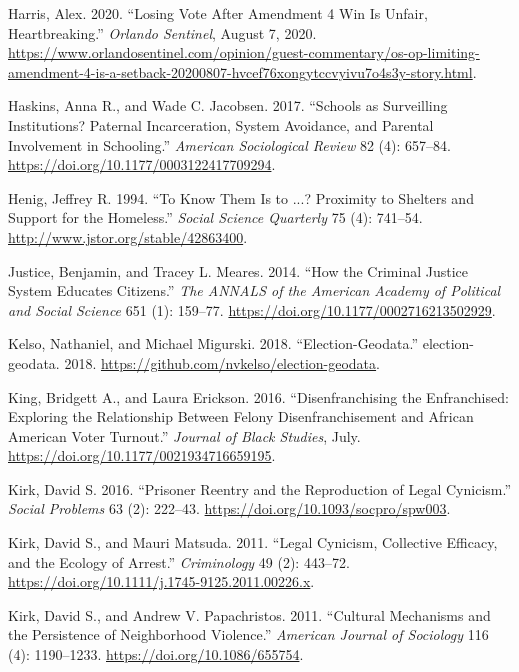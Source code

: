 \documentclass[
  12pt,
]{article}
\newlength{\cslhangindent}
\newenvironment{cslreferences}%
  {\setlength{\parindent}{0pt}%
  \everypar{\setlength{\hangindent}{\cslhangindent}}\ignorespaces}%
  {\par}
\begin{document}
\begin{cslreferences}
\leavevmode\hypertarget{ref-Harris2020}{}%
Harris, Alex. 2020. ``Losing Vote After Amendment 4 Win Is Unfair, Heartbreaking.'' \emph{Orlando Sentinel}, August 7, 2020. \url{https://www.orlandosentinel.com/opinion/guest-commentary/os-op-limiting-amendment-4-is-a-setback-20200807-hvcef76xongytccvyivu7o4s3y-story.html}.

\leavevmode\hypertarget{ref-Haskins2017}{}%
Haskins, Anna R., and Wade C. Jacobsen. 2017. ``Schools as Surveilling Institutions? Paternal Incarceration, System Avoidance, and Parental Involvement in Schooling.'' \emph{American Sociological Review} 82 (4): 657--84. \url{https://doi.org/10.1177/0003122417709294}.

\leavevmode\hypertarget{ref-Henig1994}{}%
Henig, Jeffrey R. 1994. ``To Know Them Is to ...? Proximity to Shelters and Support for the Homeless.'' \emph{Social Science Quarterly} 75 (4): 741--54. \url{http://www.jstor.org/stable/42863400}.

\leavevmode\hypertarget{ref-Justice2014}{}%
Justice, Benjamin, and Tracey L. Meares. 2014. ``How the Criminal Justice System Educates Citizens.'' \emph{The ANNALS of the American Academy of Political and Social Science} 651 (1): 159--77. \url{https://doi.org/10.1177/0002716213502929}.

\leavevmode\hypertarget{ref-Kelso2018}{}%
Kelso, Nathaniel, and Michael Migurski. 2018. ``Election-Geodata.'' election-geodata. 2018. \url{https://github.com/nvkelso/election-geodata}.

\leavevmode\hypertarget{ref-King2016}{}%
King, Bridgett A., and Laura Erickson. 2016. ``Disenfranchising the Enfranchised: Exploring the Relationship Between Felony Disenfranchisement and African American Voter Turnout.'' \emph{Journal of Black Studies}, July. \url{https://doi.org/10.1177/0021934716659195}.

\leavevmode\hypertarget{ref-Kirk2016}{}%
Kirk, David S. 2016. ``Prisoner Reentry and the Reproduction of Legal Cynicism.'' \emph{Social Problems} 63 (2): 222--43. \url{https://doi.org/10.1093/socpro/spw003}.

\leavevmode\hypertarget{ref-Kirk2011}{}%
Kirk, David S., and Mauri Matsuda. 2011. ``Legal Cynicism, Collective Efficacy, and the Ecology of Arrest.'' \emph{Criminology} 49 (2): 443--72. \url{https://doi.org/10.1111/j.1745-9125.2011.00226.x}.

\leavevmode\hypertarget{ref-Kirk2011a}{}%
Kirk, David S., and Andrew V. Papachristos. 2011. ``Cultural Mechanisms and the Persistence of Neighborhood Violence.'' \emph{American Journal of Sociology} 116 (4): 1190--1233. \url{https://doi.org/10.1086/655754}.


\end{cslreferences}
\end{document}
